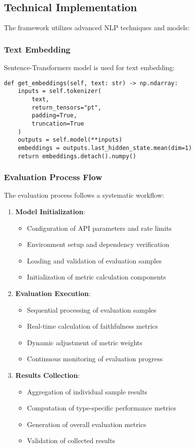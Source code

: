 \subsection{Technical Implementation}
The framework utilizes advanced NLP techniques and models:

\subsubsection{Text Embedding}
Sentence-Transformers model is used for text embedding:
\begin{verbatim}
def get_embeddings(self, text: str) -> np.ndarray:
    inputs = self.tokenizer(
        text, 
        return_tensors="pt", 
        padding=True, 
        truncation=True
    )
    outputs = self.model(**inputs)
    embeddings = outputs.last_hidden_state.mean(dim=1)
    return embeddings.detach().numpy()
\end{verbatim}

\subsubsection{Evaluation Process Flow}
The evaluation process follows a systematic workflow:
\begin{enumerate}
    \item \textbf{Model Initialization}:
    \begin{itemize}
        \item Configuration of API parameters and rate limits
        \item Environment setup and dependency verification
        \item Loading and validation of evaluation samples
        \item Initialization of metric calculation components
    \end{itemize}

    \item \textbf{Evaluation Execution}:
    \begin{itemize}
        \item Sequential processing of evaluation samples
        \item Real-time calculation of faithfulness metrics
        \item Dynamic adjustment of metric weights
        \item Continuous monitoring of evaluation progress
    \end{itemize}

    \item \textbf{Results Collection}:
    \begin{itemize}
        \item Aggregation of individual sample results
        \item Computation of type-specific performance metrics
        \item Generation of overall evaluation metrics
        \item Validation of collected results
    \end{itemize}
\end{enumerate}

